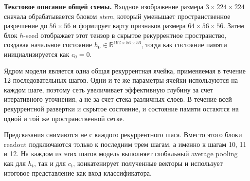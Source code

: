\documentclass[11pt,landscape]{article}
\begin{document}
{
}

\vspace{4mm}

\noindent\textbf{Текстовое описание общей схемы.}
Входное изображение размера $3\times224\times224$ сначала обрабатывается блоком \textit{stem}, который уменьшает пространственное разрешение до $56\times56$ и формирует карту признаков размера $64\times56\times56$. Затем блок $h$-seed отображает этот тензор в скрытое рекуррентное пространство, создавая начальное состояние $h_0\in\mathbb{R}^{192\times56\times56}$, тогда как состояние памяти инициализируется как $c_0=0$.

\medskip

\noindent
Ядром модели является одна общая рекуррентная ячейка, применяемая в течение 12 последовательных шагов. Одни и те же параметры ячейки используются на каждом шаге, поэтому сеть увеличивает эффективную глубину за счет итеративного уточнения, а не за счет стека различных слоев. В течение всей рекуррентной развертки и скрытое состояние, и состояние памяти остаются на одной и той же пространственной сетке.

\medskip

\noindent
Предсказания снимаются не с каждого рекуррентного шага. Вместо этого блоки readout подключаются только к последним трем шагам, а именно к шагам 10, 11 и 12. На каждом из этих шагов модель выполняет глобальный average pooling как для $h_t$, так и для $c_t$, конкатенирует полученные векторы и использует итоговое представление как вход классификатора.
\end{document}
